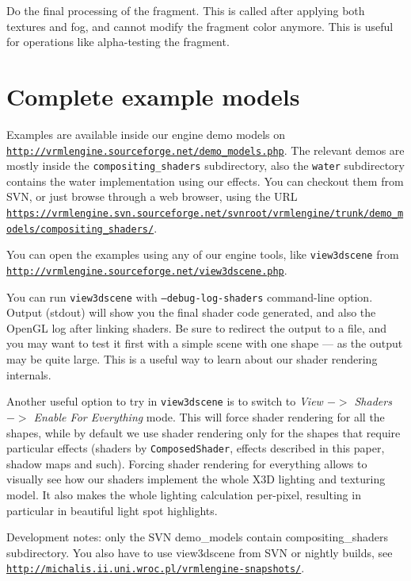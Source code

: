 \documentclass{acmsiggraph}                     %
\newcommand*{\myhref}[2]{\texttt{\href{#1}{\nolinkurl{#2}}}}
\begin{document}
Do the final processing of the fragment. This is called after applying
both textures and fog, and cannot modify the fragment color anymore.
This is useful for operations like alpha-testing the fragment.

\section{Complete example models}

Examples are available inside our engine demo models on
\myhref{http://vrmlengine.sourceforge.net/demo\_models.php}{http://vrmlengine.sourceforge.net/demo_models.php}.
The relevant demos are mostly inside the \texttt{compositing\_shaders}
subdirectory, also the \texttt{water} subdirectory contains
the water implementation using our effects.
You can checkout them from SVN, or just browse through a web browser,
using the URL
\myhref{https://vrmlengine.svn.sourceforge.net/svnroot/vrmlengine/trunk/demo\_models/compositing\_shaders/}{https://vrmlengine.svn.sourceforge.net/svnroot/vrmlengine/trunk/demo_models/compositing_shaders/}.

You can open the examples using any of our engine tools,
like \texttt{view3dscene} from
\myhref{http://vrmlengine.sourceforge.net/view3dscene.php}{http://vrmlengine.sourceforge.net/view3dscene.php}.

You can run \texttt{view3dscene} with \texttt{--debug-log-shaders} command-line
option. Output (stdout) will show you the final shader code generated,
and also the OpenGL log after linking shaders.
Be sure to redirect the output to a file, and you may want to test it first
with a simple scene with one shape --- as the output may be quite large.
This is a useful way to learn about our shader rendering internals.

Another useful option to try in \texttt{view3dscene} is to switch to
\textit{View $->$ Shaders $->$ Enable For Everything} mode.
This will force shader rendering for all the shapes,
while by default we use shader rendering only for the shapes that
require particular effects (shaders by \texttt{ComposedShader}, effects
described in this paper, shadow maps and such).
Forcing shader rendering for everything allows to visually see
how our shaders implement the whole X3D lighting and texturing model.
It also makes the whole lighting calculation per-pixel, resulting
in particular in beautiful light spot highlights.

Development notes: only the SVN demo\_models contain
compositing\_shaders subdirectory.
You also have to use view3dscene from SVN or nightly builds,
see \myhref{http://michalis.ii.uni.wroc.pl/vrmlengine-snapshots/}{http://michalis.ii.uni.wroc.pl/vrmlengine-snapshots/}.


\nocite{*}

\end{document}
